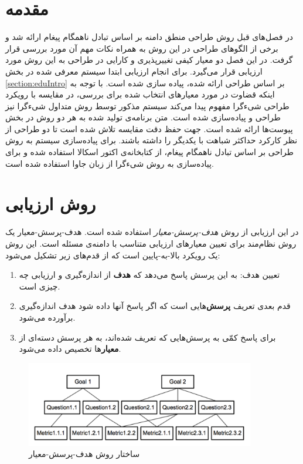 \section{مقدمه}
در فصل‌های قبل روش طراحی منطق دامنه بر اساس تبادل ناهمگام پیغام ارائه شد و برخی از الگوهای طراحی در این روش به همراه نکات مهم آن مورد بررسی قرار گرفت. در این فصل دو معیار کیفی تغییرپذیری و کارایی در طراحی به این روش مورد ارزیابی قرار می‌گیرد. برای انجام ارزیابی ابتدا سیستم معرفی شده در بخش \ref{section:eduIntro} بر اساس طراحی ارائه شده، پیاده سازی شده است. با توجه به اینکه قضاوت در مورد معیارهای انتخاب شده برای بررسی، در مقایسه با رویکرد طراحی شیءگرا مفهوم پیدا می‌کند سیستم مذکور توسط روش متداول شیءگرا نیز طراحی و پیاده‌سازی شده است. متن برنامه‌ی تولید شده به هر دو روش در بخش پیوست‌ها ارائه شده است. جهت حفظ دقت مقایسه تلاش شده است تا دو طراحی از نظر کارکرد حداکثر شباهت با یکدیگر را داشته باشند. برای پیاده‌سازی سیستم به روش طراحی بر اساس تبادل ناهمگام پیغام، از کتابخانه‌ی اکتور اسکالا استفاده شده و برای پیاده‌سازی به روش شیءگرا از زبان جاوا استفاده شده است.
\section{روش ارزیابی}
در این ارزیابی از روش \textit{هدف-پرسش-معیار} استفاده شده است. هدف-پرسش-معیار یک روش نظام‌مند برای تعیین معیارهای ارزیابی متناسب با دامنه‌ی مسئله است. این روش یک رویکرد بالا-به-پایین است که از قدم‌های زیر تشکیل می‌شود:\cite{GQM}
\begin{enumerate}
\item تعیین هدف: به این پرسش پاسخ می‌دهد که \textbf{هدف} از اندازه‌گیری  و ارزیابی چه چیزی است.
\item قدم بعدی تعریف \textbf{پرسش‌}هایی است که اگر پاسخ آنها داده شود هدف اندازه‌گیری برآورده می‌شود.
\item برای پاسخ کمّی به پرسش‌هایی که تعریف شده‌اند، به هر پرسش دسته‌ای از \textbf{معیار}ها تخصیص داده می‌شود.
\end{enumerate}

\begin{figure}[htb]
    \begin{center}
	\includegraphics[width=10cm]{5-Evaluation/Figures/gqm.pdf}
    \end{center}
    \caption{\label{fig:gqm} ساختار روش هدف-پرسش-معیار }
\end{figure}

